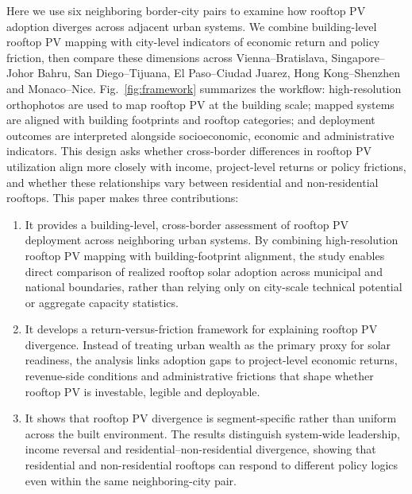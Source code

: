 \documentclass[pdflatex,sn-nature]{sn-jnl}
\begin{document}
Here we use six neighboring border-city pairs to examine how rooftop PV adoption diverges across adjacent urban systems. We combine building-level rooftop PV mapping with city-level indicators of economic return and policy friction, then compare these dimensions across Vienna--Bratislava, Singapore--Johor Bahru, San Diego--Tijuana, El Paso--Ciudad Juarez, Hong Kong--Shenzhen and Monaco--Nice. Fig.~\ref{fig:framework} summarizes the workflow: high-resolution orthophotos are used to map rooftop PV at the building scale; mapped systems are aligned with building footprints and rooftop categories; and deployment outcomes are interpreted alongside socioeconomic, economic and administrative indicators. \cite{RN8,RN9,RN25,RN26,RN28,RN29,RN30} This design asks whether cross-border differences in rooftop PV utilization align more closely with income, project-level returns or policy frictions, and whether these relationships vary between residential and non-residential rooftops.
This paper makes three contributions:
\begin{enumerate}
    \item It provides a building-level, cross-border assessment of rooftop PV deployment across neighboring urban systems. By combining high-resolution rooftop PV mapping with building-footprint alignment, the study enables direct comparison of realized rooftop solar adoption across municipal and national boundaries, rather than relying only on city-scale technical potential or aggregate capacity statistics.

    \item It develops a return-versus-friction framework for explaining rooftop PV divergence. Instead of treating urban wealth as the primary proxy for solar readiness, the analysis links adoption gaps to project-level economic returns, revenue-side conditions and administrative frictions that shape whether rooftop PV is investable, legible and deployable.

    \item It shows that rooftop PV divergence is segment-specific rather than uniform across the built environment. The results distinguish system-wide leadership, income reversal and residential--non-residential divergence, showing that residential and non-residential rooftops can respond to different policy logics even within the same neighboring-city pair.
\end{enumerate}
\end{document}

